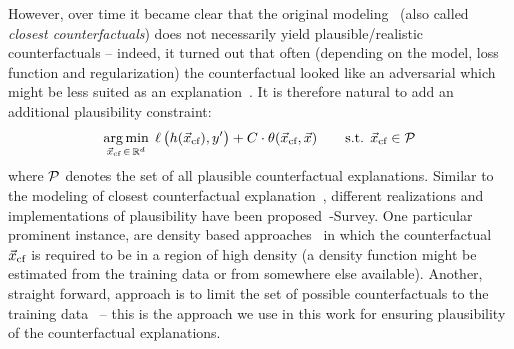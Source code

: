However, over time it became clear that the original modeling~ (also called \textit{closest counterfactuals}) does not necessarily yield plausible/realistic counterfactuals -- indeed, it turned out that often (depending on the model, loss function and regularization) the counterfactual looked like an adversarial which might be less suited as an explanation~\citep{laugel_issues_2019}. It is therefore natural to add an additional plausibility constraint:
\begin{equation}
\begin{split}
\underset{{\vec{x}_{\text{cf}}} \,\in\, \mathbb{R}^d}{\arg\min}\; \operatorname*{{\ell}}\big(h({\vec{x}_{\text{cf}}}), y'\big) + C \cdot \operatorname*{{\theta}}({\vec{x}_{\text{cf}}}, \vec{x}) \quad\quad \text{s.t. } {\vec{x}_{\text{cf}}} \in \mathcal{P}
\end{split}
\end{equation}
where $\mathcal{P}$ denotes the set of all plausible counterfactual explanations.
Similar to the modeling of closest counterfactual explanation~, different realizations and implementations of plausibility have been proposed~\citep{looveren_interpretable_2019,poyiadzi_face_2019,artelt_convex_2020}-Survey. One particular prominent instance, are density based approaches~\citep{artelt_convex_2020} in which the counterfactual ${\vec{x}_{\text{cf}}}$ is required to be in a region of high density (a density function might be estimated from the training data or from somewhere else available). Another, straight forward, approach is to limit the set of possible counterfactuals to the training data~\citep{poyiadzi_face_2019} -- this is the approach we use in this work for ensuring plausibility of the counterfactual explanations.


